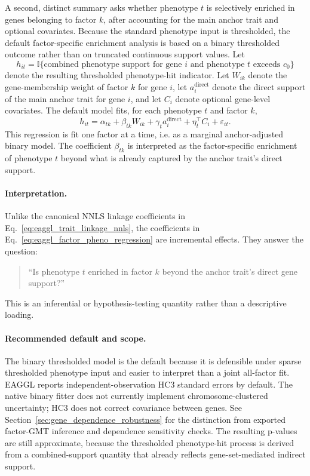 \documentclass[11pt]{article}
\begin{document}
A second, distinct summary asks whether phenotype $t$ is selectively enriched in genes belonging to factor $k$, after accounting for the main anchor trait and optional covariates. Because the standard phenotype input is thresholded, the default factor-specific enrichment analysis is based on a binary thresholded outcome rather than on truncated continuous support values. Let
\[
h_{it} = \mathbb{I}\{ \text{combined phenotype support for gene } i \text{ and phenotype } t \text{ exceeds } c_0 \}
\]
denote the resulting thresholded phenotype-hit indicator. Let $W_{ik}$ denote the gene-membership weight of factor $k$ for gene $i$, let $a_i^{\mathrm{direct}}$ denote the direct support of the main anchor trait for gene $i$, and let $C_i$ denote optional gene-level covariates. The default model fits, for each phenotype $t$ and factor $k$,
\begin{equation}
h_{it}
=
\alpha_{tk}
+
\beta_{tk} W_{ik}
+
\gamma_t a_i^{\mathrm{direct}}
+
\eta_t^\top C_i
+
\varepsilon_{it}.
\label{eq:eaggl_factor_pheno_regression}
\end{equation}
This regression is fit one factor at a time, i.e. as a marginal anchor-adjusted binary model. The coefficient $\beta_{tk}$ is interpreted as the factor-specific enrichment of phenotype $t$ beyond what is already captured by the anchor trait's direct support.

\paragraph{Interpretation.}
Unlike the canonical NNLS linkage coefficients in Eq.~\eqref{eq:eaggl_trait_linkage_nnls}, the coefficients in Eq.~\eqref{eq:eaggl_factor_pheno_regression} are incremental effects. They answer the question:
\begin{quote}
``Is phenotype $t$ enriched in factor $k$ beyond the anchor trait's direct gene support?''
\end{quote}
This is an inferential or hypothesis-testing quantity rather than a descriptive loading.

\paragraph{Recommended default and scope.}
The binary thresholded model is the default because it is defensible under sparse thresholded phenotype input and easier to interpret than a joint all-factor fit. EAGGL reports independent-observation HC3 standard errors by default. The native binary fitter does not currently implement chromosome-clustered uncertainty; HC3 does not correct covariance between genes. See Section~\ref{sec:gene_dependence_robustness} for the distinction from exported factor-GMT inference and dependence sensitivity checks. The resulting p-values are still approximate, because the thresholded phenotype-hit process is derived from a combined-support quantity that already reflects gene-set-mediated indirect support.
\end{document}
